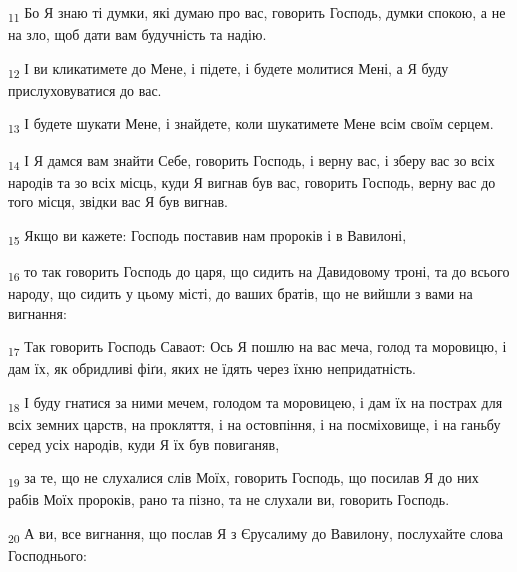 \begin{tcolorbox}
\textsubscript{11} Бо Я знаю ті думки, які думаю про вас, говорить Господь, думки спокою, а не на зло, щоб дати вам будучність та надію.
\end{tcolorbox}
\begin{tcolorbox}
\textsubscript{12} І ви кликатимете до Мене, і підете, і будете молитися Мені, а Я буду прислуховуватися до вас.
\end{tcolorbox}
\begin{tcolorbox}
\textsubscript{13} І будете шукати Мене, і знайдете, коли шукатимете Мене всім своїм серцем.
\end{tcolorbox}
\begin{tcolorbox}
\textsubscript{14} І Я дамся вам знайти Себе, говорить Господь, і верну вас, і зберу вас зо всіх народів та зо всіх місць, куди Я вигнав був вас, говорить Господь, верну вас до того місця, звідки вас Я був вигнав.
\end{tcolorbox}
\begin{tcolorbox}
\textsubscript{15} Якщо ви кажете: Господь поставив нам пророків і в Вавилоні,
\end{tcolorbox}
\begin{tcolorbox}
\textsubscript{16} то так говорить Господь до царя, що сидить на Давидовому троні, та до всього народу, що сидить у цьому місті, до ваших братів, що не вийшли з вами на вигнання:
\end{tcolorbox}
\begin{tcolorbox}
\textsubscript{17} Так говорить Господь Саваот: Ось Я пошлю на вас меча, голод та моровицю, і дам їх, як обридливі фіґи, яких не їдять через їхню непридатність.
\end{tcolorbox}
\begin{tcolorbox}
\textsubscript{18} І буду гнатися за ними мечем, голодом та моровицею, і дам їх на пострах для всіх земних царств, на прокляття, і на остовпіння, і на посміховище, і на ганьбу серед усіх народів, куди Я їх був повиганяв,
\end{tcolorbox}
\begin{tcolorbox}
\textsubscript{19} за те, що не слухалися слів Моїх, говорить Господь, що посилав Я до них рабів Моїх пророків, рано та пізно, та не слухали ви, говорить Господь.
\end{tcolorbox}
\begin{tcolorbox}
\textsubscript{20} А ви, все вигнання, що послав Я з Єрусалиму до Вавилону, послухайте слова Господнього:
\end{tcolorbox}
